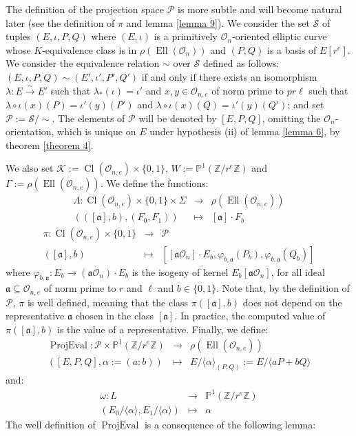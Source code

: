 \documentclass[a4paper,10pt]{report}
\theoremstyle{definition}
\theoremstyle{plain}
\theoremstyle{definition}
\newcommand{\Z}{\mathbb{Z}}
\newcommand{\m}[1]{\mathcal{#1}}
\newcommand{\mO}{\mathcal{O}}
\renewcommand{\(}{\left(}
\renewcommand{\)}{\right)}
\renewcommand{\P}{\mathbb{P}}
\newcommand{\mf}[1]{\mathfrak{#1}}
\DeclareMathOperator{\Cl}{Cl}
\DeclareMathOperator{\Ell}{Ell}
\DeclareMathOperator{\ProjEval}{ProjEval}
\begin{document}
The definition of the projection space $\m{P}$ is more subtle and will become natural later (see the definition of $\pi$ and lemma \ref{lemma 9}). We consider the set $\m{S}$ of tuples $(E,\iota,P,Q)$ where $(E,\iota)$ is a primitively $\mO_n$-oriented elliptic curve whose $K$-equivalence class is in $\rho(\Ell(\mO_n))$ and $(P,Q)$ is a basis of $E[r^e]$. We consider the equivalence relation $\sim$ over $\m{S}$ defined as follows: $(E,\iota,P,Q)\sim (E',\iota',P',Q')$ if and only if there exists an isomorphism $\lambda : E\overset{\sim}{\longrightarrow} E'$ such that $\lambda_*(\iota)=\iota'$ and $x, y\in\mO_{n,e}$ of norm prime to $p r\ell$ such that $\lambda\circ\iota(x)(P)=\iota'(y)(P')$ and $\lambda\circ\iota(x)(Q)=\iota'(y)(Q')$; and set $\m{P}:=\m{S}/\sim$. The elements of $\m{P}$ will be denoted by $[E,P,Q]$, omitting the $\mO_n$-orientation, which is unique on $E$ under hypothesis (ii) of lemma \ref{lemma 6}, by theorem \ref{theorem 4}. 

We also set $\m{K}:=\Cl(\mO_{n,e})\times\{0,1\}$, $W:=\P^1(\Z/r^e\Z)$ and $\Gamma:=\rho(\Ell(\mO_{n,e}))$. We define the functions:
\[\begin{array}{rcl}
\Lambda : \Cl(\mO_{n,e})\times\{0,1\}\times \Sigma & \longrightarrow & \rho(\Ell(\mO_{n,e}))\\
(([\mf{a}], b),(F_0,F_1)) & \longmapsto & [\mf{a}]\cdot F_b
\end{array}\]
\[\begin{array}{rcl}
\pi : \Cl(\mO_{n,e})\times\{0,1\} & \longrightarrow & \m{P}\\
([\mf{a}], b) & \longmapsto & [[\mf{a}\mO_n]\cdot E_b,\varphi_{b,\mf{a}}(P_b),\varphi_{b,\mf{a}}(Q_b)]
\end{array}\]
where $\varphi_{b,\mf{a}}: E_b\longrightarrow (\mf{a}\mO_n)\cdot E_b$ is the isogeny of kernel $E_b[\mf{a}\mO_n]$, for all ideal $\mf{a}\subseteq\mO_{n,e}$ of norm prime to $r$ and $\ell$ and $b\in\{0,1\}$. Note that, by the definition of $\m{P}$, $\pi$ is well defined, meaning that the class $\pi([\mf{a}],b)$ does not depend on the representative $\mf{a}$ chosen in the class $[\mf{a}]$.  In practice, the computed value of $\pi([\mf{a}],b)$ is the value of a representative. Finally, we define:
\[\begin{array}{rcl}
\ProjEval :\m{P}\times \P^1(\Z/r^e\Z) & \longrightarrow & \rho(\Ell(\mO_{n,e}))\\
([E,P,Q],\alpha:=(a:b)) & \longmapsto & E/\langle\alpha\rangle_{(P,Q)}:=E/\langle aP+bQ\rangle
\end{array}\]
and:
\[\begin{array}{rcl}
\omega : L & \longrightarrow & \P^1(\Z/r^e\Z)\\
(E_0/\langle\alpha\rangle,E_1/\langle\alpha\rangle) & \longmapsto & \alpha
\end{array}\]
The well definition of $\ProjEval$ is a consequence of the following lemma:
\end{document}
